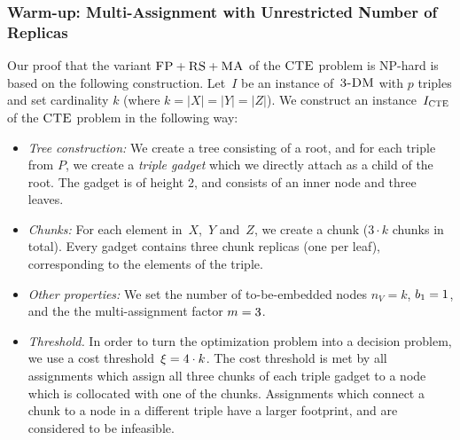 \subsubsection{Warm-up: Multi-Assignment with Unrestricted Number of Replicas}

Our proof that the variant $\textsc{FP}+\textsc{RS}+\textsc{MA}$ of the $\textsc{CTE}$ problem is NP-hard is based on the following construction.
Let~$I$ be an instance of~$\textsc{3-DM}$ with $p$ triples and set cardinality $k$ (where $k = |X| = |Y| = |Z|$).
We construct an instance~$I_{\mathrm{\textsc{CTE}}}$ of the $\textsc{CTE}$ problem in the following way:
\begin{itemize}
\item \emph{Tree construction:} We create a tree consisting of a root,
and for each triple from $P$, we create a \emph{triple gadget} which we directly attach as
a child of the root. The gadget is of height 2,
and consists of an inner node and three leaves.
\item \emph{Chunks:} For each element in~$X$,~$Y$ and~$Z$,
 we create a chunk
($3 \cdot k$ chunks in total). Every gadget contains three chunk replicas (one per leaf),
corresponding to the elements of the triple.
\item \emph{Other properties:} We set the number of to-be-embedded nodes $n_V = k$,
$b_1 = 1$, and the the multi-assignment factor
$m=3$.
\item \emph{Threshold.} In order to turn the optimization problem into a decision problem, we use
a cost threshold~$\xi = 4\cdot k$. The cost threshold is met by all
assignments which assign all three chunks of each triple gadget to a
node which is collocated with one of the chunks. Assignments which connect a
chunk to a node in a different triple have a larger footprint, and are
considered to be infeasible.

\end{itemize}

%

